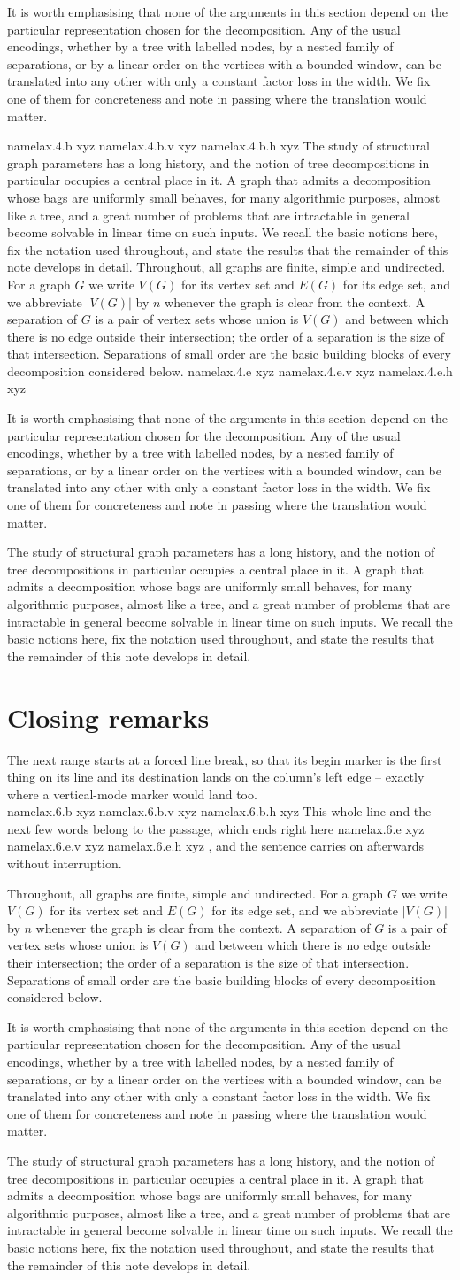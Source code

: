\documentclass[twocolumn]{article}
\newcommand\laxmark[2]{%
  \pdfdest name{lax.#2.#1} xyz\relax
  \ifvmode\pdfdest name{lax.#2.#1.v} xyz\relax
  \else\pdfdest name{lax.#2.#1.h} xyz\relax\fi}
\newcommand{\fillerA}{The study of structural graph parameters has a long
history, and the notion of tree decompositions in particular occupies a
central place in it. A graph that admits a decomposition whose bags are
uniformly small behaves, for many algorithmic purposes, almost like a tree,
and a great number of problems that are intractable in general become
solvable in linear time on such inputs. We recall the basic notions here,
fix the notation used throughout, and state the results that the remainder
of this note develops in detail.}
\newcommand{\fillerB}{Throughout, all graphs are finite, simple and
undirected. For a graph $G$ we write $V(G)$ for its vertex set and $E(G)$
for its edge set, and we abbreviate $|V(G)|$ by $n$ whenever the graph is
clear from the context. A separation of $G$ is a pair of vertex sets whose
union is $V(G)$ and between which there is no edge outside their
intersection; the order of a separation is the size of that intersection.
Separations of small order are the basic building blocks of every
decomposition considered below.}
\newcommand{\fillerC}{It is worth emphasising that none of the arguments in
this section depend on the particular representation chosen for the
decomposition. Any of the usual encodings, whether by a tree with labelled
nodes, by a nested family of separations, or by a linear order on the
vertices with a bounded window, can be translated into any other with only
a constant factor loss in the width. We fix one of them for concreteness
and note in passing where the translation would matter.}
\begin{document}
\fillerC

\laxmark{b}{4}%
\fillerA
\fillerB
\laxmark{e}{4}%

\fillerC

\fillerA

\section{Closing remarks}

The next range starts at a forced line break, so that its begin marker is
the first thing on its line and its destination lands on the column's left
edge -- exactly where a vertical-mode marker would land too.\\
\laxmark{b}{6}%
This whole line and the next few words belong to the passage, which ends
right here\laxmark{e}{6}%
, and the sentence carries on afterwards without interruption.

\fillerB

\fillerC

\fillerA
\end{document}

